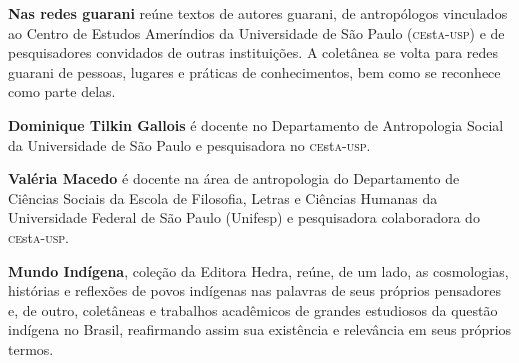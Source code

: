 \textbf{Nas redes guarani} reúne textos de autores guarani, de antropólogos vinculados ao Centro de Estudos Ameríndios da Universidade de São Paulo (\textsc{ce}st\textsc{a}-\textsc{usp}) e de pesquisadores convidados de outras instituições. A coletânea se volta para redes guarani de pessoas, lugares e práticas de conhecimentos, bem como se reconhece como parte delas.

\textbf{Dominique Tilkin Gallois} é docente no Departamento de Antropologia Social da Universidade de São Paulo e pesquisadora no \textsc{ce}st\textsc{a}-\textsc{usp}.

\textbf{Valéria Macedo} é docente na área de antropologia do Departamento de Ciências Sociais da Escola de Filosofia, Letras e Ciências Humanas da Universidade Federal de São Paulo (Unifesp) e pesquisadora colaboradora do \textsc{ce}st\textsc{a}-\textsc{usp}.

\textbf{Mundo Indígena}, coleção da Editora Hedra, reúne, de um lado, as cosmologias, histórias
e reflexões de povos indígenas nas palavras de seus próprios pensadores e, de outro, coletâneas
e trabalhos acadêmicos de grandes estudiosos da questão indígena no Brasil, reafirmando assim sua
existência e relevância em seus próprios termos.\par